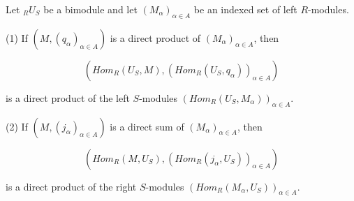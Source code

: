 Let ${}_R U_S$ be a bimodule and let $(M_\alpha)_{\alpha \in A}$ be an indexed set of left $R$-modules.

(1) If $(M, (q_\alpha)_{\alpha \in A})$ is a direct product of $(M_\alpha)_{\alpha \in A}$, then

$$(Hom_R(U_S, M), (Hom_R(U_S, q_\alpha))_{\alpha \in A})$$

is a direct product of the left $S$-modules $(Hom_R(U_S, M_\alpha))_{\alpha \in A}$.

(2) If $(M, (j_\alpha)_{\alpha \in A})$ is a direct sum of $(M_\alpha)_{\alpha \in A}$, then

$$(Hom_R(M, U_S), (Hom_R(j_\alpha, U_S))_{\alpha \in A})$$

is a direct product of the right $S$-modules $(Hom_R(M_\alpha, U_S))_{\alpha \in A}$.

